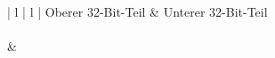 \begin{center}
\begin{tabular}{ | l | l | }
\hline
	Oberer 32-Bit-Teil & Unterer 32-Bit-Teil \\
\hline
{} \\
\hline
{} &  \\
\hline
\end{tabular}
\end{center}

